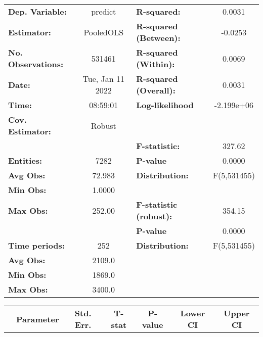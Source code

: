 \begin{center}
\begin{tabular}{lclc}
\toprule
\textbf{Dep. Variable:}    &      predict       & \textbf{  R-squared:         }   &      0.0031      \\
\textbf{Estimator:}        &     PooledOLS      & \textbf{  R-squared (Between):}  &     -0.0253      \\
\textbf{No. Observations:} &       531461       & \textbf{  R-squared (Within):}   &      0.0069      \\
\textbf{Date:}             &  Tue, Jan 11 2022  & \textbf{  R-squared (Overall):}  &      0.0031      \\
\textbf{Time:}             &      08:59:01      & \textbf{  Log-likelihood     }   &    -2.199e+06    \\
\textbf{Cov. Estimator:}   &       Robust       & \textbf{                     }   &                  \\
\textbf{}                  &                    & \textbf{  F-statistic:       }   &      327.62      \\
\textbf{Entities:}         &        7282        & \textbf{  P-value            }   &      0.0000      \\
\textbf{Avg Obs:}          &       72.983       & \textbf{  Distribution:      }   &   F(5,531455)    \\
\textbf{Min Obs:}          &       1.0000       & \textbf{                     }   &                  \\
\textbf{Max Obs:}          &       252.00       & \textbf{  F-statistic (robust):} &      354.15      \\
\textbf{}                  &                    & \textbf{  P-value            }   &      0.0000      \\
\textbf{Time periods:}     &        252         & \textbf{  Distribution:      }   &   F(5,531455)    \\
\textbf{Avg Obs:}          &       2109.0       & \textbf{                     }   &                  \\
\textbf{Min Obs:}          &       1869.0       & \textbf{                     }   &                  \\
\textbf{Max Obs:}          &       3400.0       & \textbf{                     }   &                  \\
\bottomrule
\end{tabular}
\begin{tabular}{lcccccc}
                & \textbf{Parameter} & \textbf{Std. Err.} & \textbf{T-stat} & \textbf{P-value} & \textbf{Lower CI} & \textbf{Upper CI}  \\

\end{tabular}
\end{center}
